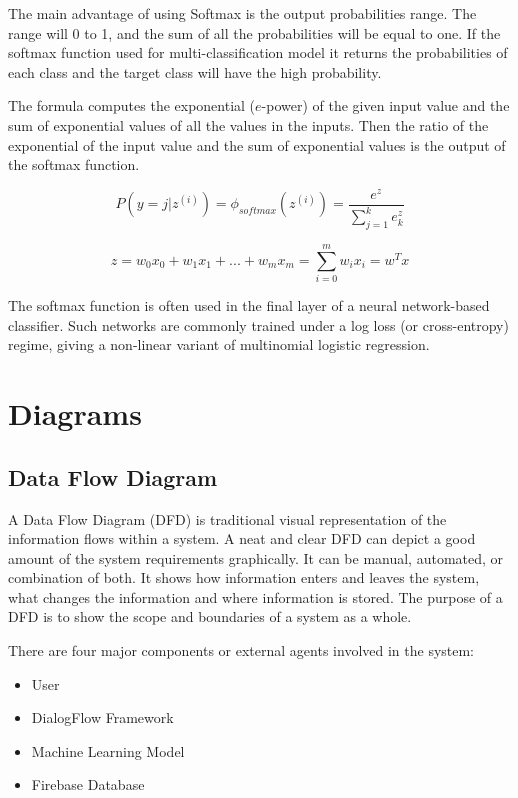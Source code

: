 The main advantage of using Softmax is the output probabilities range. The range will 0 to 1, and the sum of all the probabilities will be equal to one. If the softmax function used for multi-classification model it returns the probabilities of each class and the target class will have the high probability.

The formula computes the exponential ($e$-power) of the given input value and the sum of exponential values of all the values in the inputs. Then the ratio of the exponential of the input value and the sum of exponential values is the output of the softmax function.

\[
    P(y = j | z^{(i)}) = \phi_{softmax} (z^{(i)}) = \frac{e^z}{\sum_{j=1}^{k} e^z_k}
\]

\[
    z = w_0x_0 + w_1x_1 + ... + w_mx_m = \sum_{i=0}^{m} w_ix_i = w^Tx
\]

The softmax function is often used in the final layer of a neural network-based classifier. Such networks are commonly trained under a log loss (or cross-entropy) regime, giving a non-linear variant of multinomial logistic regression.

\pagebreak

\section{Diagrams}

\subsection{Data Flow Diagram}

A Data Flow Diagram (DFD) is traditional visual representation of the information flows within a system. A neat and clear DFD can depict a good amount of the system requirements graphically. It can be manual, automated, or combination of both. It shows how information enters and leaves the system, what changes the information and where information is stored. The purpose of a DFD is to show the scope and boundaries of a system as a whole.

There are four major components or external agents involved in the system:
\begin{itemize}
    \item User
    \item DialogFlow Framework
    \item Machine Learning Model
    \item Firebase Database
\end{itemize}

